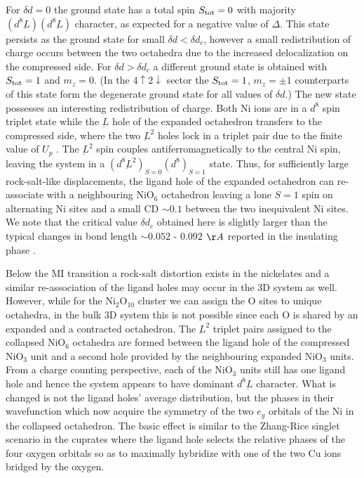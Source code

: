 \documentclass[showpacs,preprintnumbers,amsmath,amssymb,prl,aps,twocolumn,superscriptaddress]{revtex4}
\newcommand{\ligand}{{\underbar L}}
\begin{document}
For $\delta d = 0$ the ground state has a 
total spin $S_{\rm tot} = 0$ with majority $(d^8\ligand)(d^8\ligand)$ 
character, as expected for a negative value of $\Delta$. This 
state persists as the ground state for small $\delta d < \delta d_c$,
however a small  
redistribution of charge occurs between the two octahedra due to 
the increased delocalization on the compressed side.   
For $\delta d > \delta d_c$ a different ground state is obtained with 
$S_{\rm tot} = 1$ and $m_z = 0$.  
(In the $4\uparrow2\downarrow$ sector the $S_{\rm tot} = 1$, $m_z = \pm 1$ 
counterparts of this state form the degenerate ground state for 
all values of $\delta d$.) 
The new state possesses an interesting redistribution of charge. 
Both Ni ions are in a $d^8$ spin triplet state while 
the $\ligand$ hole of the expanded octahedron transfers to the compressed side, 
where the two $\ligand^2$ holes 
lock in a triplet pair due to the finite value of $U_{p}$ \cite{ElfimovPRL2002}. 
The $\ligand^2$ spin couples antiferromagnetically to the central Ni
spin, leaving the  
system in a $(d^8\ligand^2)_{S = 0}(d^8)_{S=1}$ state.  
Thus, for sufficiently large rock-salt-like displacements, 
the ligand hole of the expanded octahedron can re-associate with a neighbouring 
NiO$_6$ octahedron leaving a lone $S = 1$ spin on alternating Ni sites  
and a small CD $\sim 0.1$ between the two inequivalent Ni sites. 
We note that the critical value $\delta d_c$ obtained here is slightly larger 
than the   
typical changes in bond length $\sim 0.052$ - $0.092$ $\AA$ reported 
in the insulating phase \cite{MedardePRB2008,GarciaMunozPRB2009, AlonsoPRB2013}. 

Below the MI transition a rock-salt distortion exists in the
nickelates and  a 
similar re-association of the ligand holes may occur in the 3D
system as well. However, while for the Ni$_2$O$_{10}$ cluster we can assign 
the O sites  to unique octahedra, in the bulk 3D system this
is not possible since each O is shared by an expanded and a contracted
octahedron. The $\ligand^2$ triplet pairs assigned to the collapsed
NiO$_6$ octahedra are formed between the  ligand hole of the compressed
NiO$_3$ unit and a second hole provided by the neighbouring
expanded NiO$_3$ units. From a charge counting perspective, each of
the NiO$_3$ units still has one ligand hole and hence the system
appears to have dominant $d^8\ligand$ character. What is changed
is not the ligand holes' average distribution, but the phases in their wavefunction
which now acquire the symmetry of the two $e_g$ orbitals of the Ni
in the collapsed octahedron. The basic effect is similar to the Zhang-Rice 
singlet scenario in the cuprates where the ligand hole selects the 
relative phases of the four oxygen orbitals so as to maximally 
hybridize with one of the two Cu ions bridged by the oxygen. 
\end{document}

